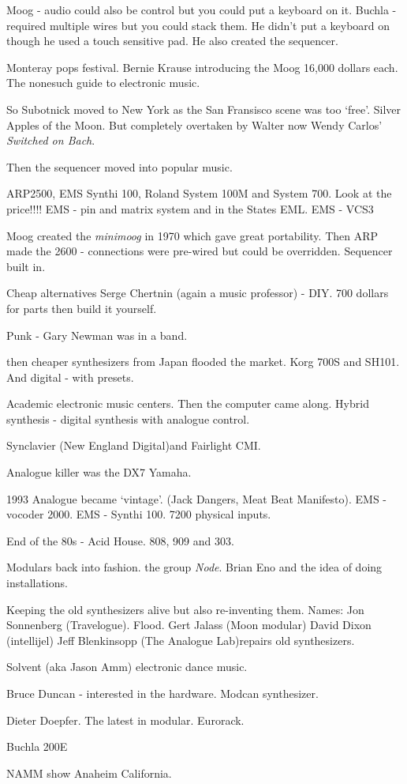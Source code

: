 Moog - audio could also be control but you could put a keyboard on it.
Buchla - required multiple wires but you could stack them. He didn't put a keyboard on though he used a touch sensitive pad. He also created the sequencer. 

Monteray pops festival. Bernie Krause introducing the Moog 16,000 dollars each.
The nonesuch guide to electronic music.  

So Subotnick moved to New York as the San Fransisco scene was too `free'. Silver Apples of the Moon. But completely overtaken by Walter now Wendy Carlos' \textit{Switched on Bach}. 

Then the sequencer moved into popular music.

ARP2500, EMS Synthi 100, Roland System 100M and System 700. Look at the price!!!! 
EMS - pin and matrix system and in the States EML. 
EMS - VCS3

Moog created the \textit{minimoog} in 1970 which gave great portability. Then ARP made the 2600 - connections were pre-wired but could be overridden. Sequencer built in. 

Cheap alternatives Serge Chertnin (again a music professor) - DIY. 700 dollars for parts then build it yourself.   

Punk - Gary Newman was in a band. 

then cheaper synthesizers from Japan flooded the market. Korg 700S and SH101. 
And digital - with presets. 

Academic electronic music centers. Then the computer came along. Hybrid synthesis - digital synthesis with analogue control. 

Synclavier (New England Digital)and Fairlight CMI. 

Analogue killer was the DX7 Yamaha. 

1993 Analogue became `vintage'. (Jack Dangers, Meat Beat Manifesto). EMS - vocoder 2000.   
EMS - Synthi 100. 7200 physical inputs. 

End of the 80s - Acid House. 808, 909 and 303. 

Modulars back into fashion. the group \textit{Node}. Brian Eno and the idea of doing installations. 

Keeping the old synthesizers alive but also re-inventing them. 
Names: Jon Sonnenberg (Travelogue). Flood. Gert Jalass (Moon modular) David Dixon (intellijel) Jeff Blenkinsopp (The Analogue Lab)repairs old synthesizers. 

Solvent (aka Jason Amm) electronic dance music.  

Bruce Duncan - interested in the hardware. Modcan synthesizer.

Dieter Doepfer. The latest in modular. Eurorack.

Buchla 200E

NAMM show Anaheim California.

